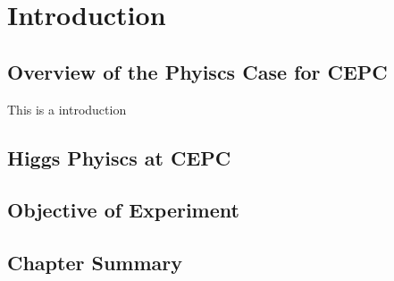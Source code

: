 
\chapter{Introduction}
\label{chap:1}

\section{Overview of the Phyiscs Case for CEPC}

This is a introduction

\section{Higgs Phyiscs at CEPC}

\section{Objective of Experiment}

\section{Chapter Summary}

